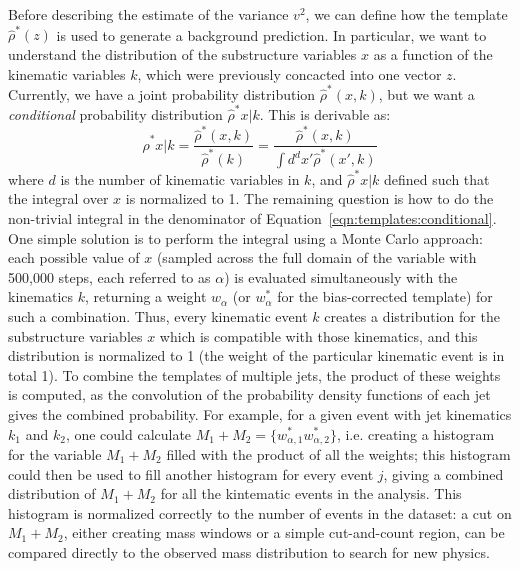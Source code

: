 Before describing the estimate of the variance $v^2$, we can define how the template $\hat{\rho}^*(z)$ is used to generate a background prediction. In particular, we want to understand the distribution of the substructure variables $x$ as a function of the kinematic variables $k$, which were previously concacted into one vector $z$. Currently, we have a joint probability distribution $\hat{\rho}^*(x,k)$, but we want a \textit{conditional} probability distribution $\hat{\rho}^*{x|k}$. This is derivable as:
%
\begin{equation}
\label{eqn:templates:conditional}
\hat{\rho}^*{x|k} = \frac{\hat{\rho}^*(x,k)}{\hat{\rho}^*(k)} = \frac{\hat{\rho}^*(x,k)}{\int d^d x' \hat{\rho}^*(x',k)} 
\end{equation}
%
where $d$ is the number of kinematic variables in $k$, and $\hat{\rho}^*{x|k}$ defined such that the integral over $x$ is normalized to 1. The remaining question is how to do the non-trivial integral in the denominator of Equation~\ref{eqn:templates:conditional}. One simple solution is to perform the integral using a Monte Carlo approach: each possible value of $x$ (sampled across the full domain of the variable with 500,000 steps, each referred to as $\alpha$) is evaluated simultaneously with the kinematics $k$, returning a weight $w_\alpha$ (or $w^*_\alpha$ for the bias-corrected template) for such a combination. Thus, every kinematic event $k$ creates a distribution for the substructure variables $x$ which is compatible with those kinematics, and this distribution is normalized to 1 (the weight of the particular kinematic event is in total 1). To combine the templates of multiple jets, the product of these weights is computed, as the convolution of the probability density functions of each jet gives the combined probability. For example, for a given event with jet kinematics $k_1$ and $k_2$, one could calculate $M_1 + M_2 = \{w^*_{\alpha,1} w^*_{\alpha,2}\}$, i.e. creating a histogram for the variable $M_1 + M_2$ filled with the product of all the weights; this histogram could then be used to fill another histogram for every event $j$, giving a combined distribution of $M_1 + M_2$ for all the kintematic events in the analysis. This histogram is normalized correctly to the number of events in the dataset: a cut on $M_1 + M_2$, either creating mass windows or a simple cut-and-count region, can be compared directly to the observed mass distribution to search for new physics.

